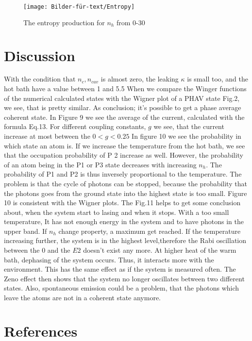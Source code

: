 \documentclass[12pt,a4paper]{article}
\begin{document}
\begin{figure}[hbtp]
\centering
\texttt{[image: Bilder-für-text/Entropy]}
\caption{The entropy production for $n_h$ from 0-30}
\end{figure}
\newpage
\section{Discussion}
With the condition that $n_c, n_{cav}$ is almost zero, the leaking $\kappa$ is small too, and the hot bath have a value between 1 and 5.5 When we compare the Winger functions of the numerical calculated states with the Wigner plot of a PHAV state Fig.2, we see, that is pretty similar. As conclusion; it's possible to get a phase average coherent state. 
In Figure 9 we see the average of the current, calculated with the formula Eq.13.  For different coupling constants, $g$
we see, that the current increase at most between the $ 0<g<0.25$ 
In figure 10 we see the probability in which state an atom is. If we increase the temperature from the hot bath, we see that the occupation probability of P 2 increase as well. However, the probability of an atom being in the P1 or P3 state decreases with increasing $n_h$. The probability of P1 and P2 is thus inversely proportional to the temperature.
The problem is that the cycle of photons can be stopped, because the probability that the photons goes from the ground state into the highest state is too small.
Figure 10 is consistent with the Wigner plots.
The Fig.11 helps to get some conclusion about, when the system start to lasing and when it stops. With a too small temperature, It has not enough energy in the system and to have photons in the upper band. If $n_h$ change property, a maximum get reached. If the temperature increasing further, the system is in the highest level,therefore the Rabi oscillation between the 0 and the $E2$ doesn't exist any more.
At higher heat of the warm bath, dephasing of the system occurs. Thus, it interacts more with the environment. This has the same effect as if the system is measured often. The Zeno effect then shows that the system no longer oscillates between two different states. Also, spontaneous  emission could be a problem, that the photons which leave the atoms are not in a coherent state anymore. \cite{Niedenzu2019}
\cite{Scovil1959}
\section{References}
\printbibliography[title={Whole bibliography}]
\end{document}
